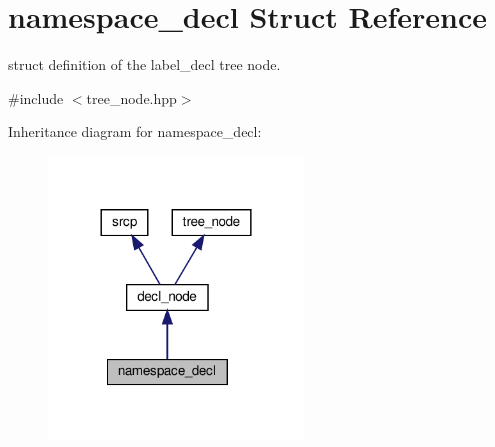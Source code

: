 \hypertarget{structnamespace__decl}{}\section{namespace\+\_\+decl Struct Reference}
\label{structnamespace__decl}


struct definition of the label\+\_\+decl tree node.  




{\ttfamily \#include $<$tree\+\_\+node.\+hpp$>$}



Inheritance diagram for namespace\+\_\+decl\+:
\nopagebreak
\begin{figure}[H]
\begin{center}
\leavevmode
\includegraphics[width=192pt]{d4/df0/structnamespace__decl__inherit__graph}
\end{center}
\end{figure}


